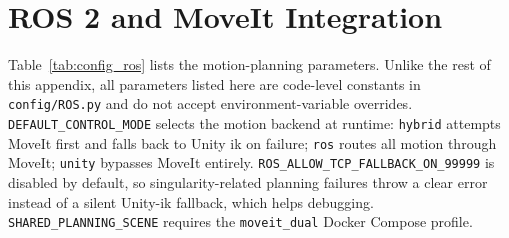 \documentclass[
     12pt,
     a4paper,
     BCOR=10mm,
     DIV=14,
     listof=totoc,
     bibliography=totoc,
     parskip,
     twoside,
     headsepline
     ]{scrreprt}
\begin{document}
\begin{table}[ht]
	\centering
	\caption{LLM configuration parameters.}
	\label{tab:config_llm}
\end{table}

\section{ROS 2 and MoveIt Integration}\label{appendix:config:ros}
Table~\ref{tab:config_ros} lists the motion-planning parameters. Unlike the rest of this appendix, all parameters listed here are code-level constants in \texttt{config/ROS.py} and do not accept environment-variable overrides. \texttt{DEFAULT\_CONTROL\_MODE} selects the motion backend at runtime: \texttt{hybrid} attempts MoveIt first and falls back to Unity \gls{ik} on failure; \texttt{ros} routes all motion through MoveIt; \texttt{unity} bypasses MoveIt entirely. \texttt{ROS\_ALLOW\_TCP\_FALLBACK\_ON\_99999} is disabled by default, so singularity-related planning failures throw a clear error instead of a silent Unity-\gls{ik} fallback, which helps debugging. \texttt{SHARED\_PLANNING\_SCENE} requires the \texttt{moveit\_dual} Docker Compose profile.
\end{document}
